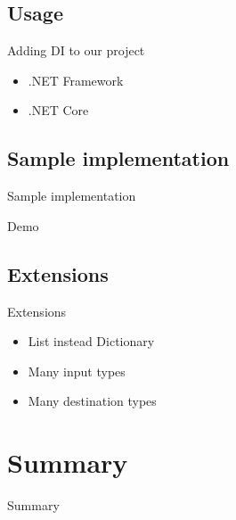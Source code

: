 \documentclass{beamer}
\begin{document}
\subsection*{Usage}
\begin{frame}{Adding DI to our project}
\begin{center}
\Large{\begin{itemize}
	\item .NET Framework
	\item .NET Core
\end{itemize}}
\end{center}
\end{frame}

\subsection*{Sample implementation}
\begin{frame}{Sample implementation}
\begin{center}
\Huge{Demo}
\end{center}
\end{frame}

\subsection*{Extensions}
\begin{frame}{Extensions}
\begin{center}
\Large{\begin{itemize}
	\item List instead Dictionary
	\item Many input types
	\item Many destination types
\end{itemize}}
\end{center}
\end{frame}	


\section{Summary}

\begin{frame}{}
\begin{center}
\Huge{Summary}
\end{center}
\end{frame}
\end{document}
